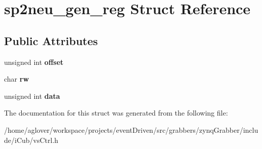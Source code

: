 \hypertarget{structsp2neu__gen__reg}{\section{sp2neu\-\_\-gen\-\_\-reg Struct Reference}
\label{structsp2neu__gen__reg}
}
\subsection*{Public Attributes}
\begin{DoxyCompactItemize}
\item 
\hypertarget{structsp2neu__gen__reg_a71609646027307154b82fd9323b0a63d}{unsigned int {\bfseries offset}}\label{structsp2neu__gen__reg_a71609646027307154b82fd9323b0a63d}

\item 
\hypertarget{structsp2neu__gen__reg_a3d4d172baa1021c180290c7fa6015ef0}{char {\bfseries rw}}\label{structsp2neu__gen__reg_a3d4d172baa1021c180290c7fa6015ef0}

\item 
\hypertarget{structsp2neu__gen__reg_aabd7dd2a0d1fe28ddfbcf805d3d55d40}{unsigned int {\bfseries data}}\label{structsp2neu__gen__reg_aabd7dd2a0d1fe28ddfbcf805d3d55d40}

\end{DoxyCompactItemize}


The documentation for this struct was generated from the following file\-:\begin{DoxyCompactItemize}
\item 
/home/aglover/workspace/projects/event\-Driven/src/grabbers/zynq\-Grabber/include/i\-Cub/vs\-Ctrl.\-h\end{DoxyCompactItemize}
